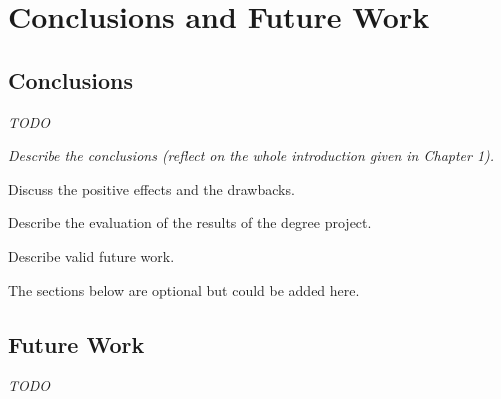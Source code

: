 \documentclass[/home/francois/latex/report/main.tex]{subfiles}
\begin{document}
\chapter{Conclusions and Future Work}
\label{chapter:conclusions}

\section{Conclusions}

\textit{TODO}

{\it
Describe the conclusions (reflect on the whole introduction given in Chapter 1).

Discuss the positive effects and the drawbacks.

Describe the evaluation of the results of the degree project.

Describe valid future work.

The sections below are optional but could be added here.
}

\section{Future Work}

\textit{TODO}
\end{document}
